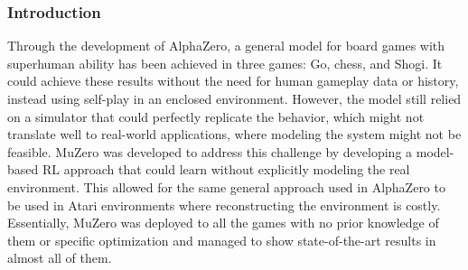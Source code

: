 \subsubsection{Introduction}
Through the development of AlphaZero, a general model for board games with
superhuman ability has been achieved in three games: Go, chess, and Shogi. It
could achieve these results without the need for human gameplay data or
history, instead using self-play in an enclosed environment. However, the model
still relied on a simulator that could perfectly replicate the behavior, which
might not translate well to real-world applications, where modeling the system
might not be feasible. MuZero was developed to address this challenge by
developing a model-based RL approach that could learn without explicitly
modeling the real environment. This allowed for the same general approach used
in AlphaZero to be used in Atari environments where reconstructing the
environment is costly. Essentially, MuZero was deployed to all the games with
no prior knowledge of them or specific optimization and managed to show
state-of-the-art results in almost all of them.

